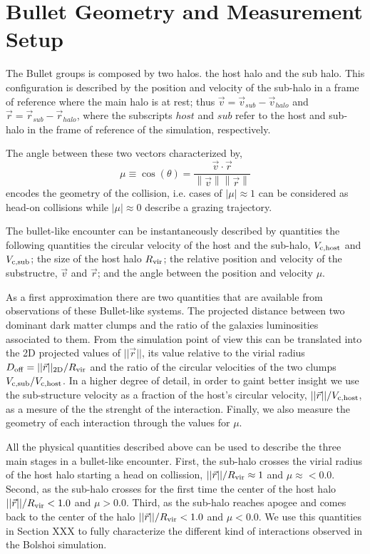 \documentclass{emulateapj}
\begin{document}
\section{Bullet Geometry and Measurement Setup}
\label{sec:setup}

The Bullet groups is composed by two halos. the host halo and the sub
halo. This configuration is described by the position and velocity of
the sub-halo in a frame of reference where the main halo is at rest;
thus  $\vec{v{}}=\vec{v}_{sub}-\vec{v}_{halo}$ and 
$\vec{r}=\vec{r}_{sub}-\vec{r}_{halo}$, where the subscripts $host$
and $sub$ refer to the host and sub-halo in the frame of reference of
the simulation, respectively.

The angle between these two vectors characterized by, 
\begin{equation}
  \mu\equiv
  \cos(\theta)=\frac{\vec{v{}}\cdotp{}\vec{r}}{\left\|\vec{v}{}\right\|
    \left\|\vec{r}\right\|} 
 \end{equation} 
%
encodes the geometry of the collision, i.e. cases of $|\mu|\approx 1$
can be considered as head-on collisions while $|\mu|\approx 0$
describe a grazing trajectory.

The bullet-like encounter can be instantaneously described by
quantities the following quantities the circular velocity of the host
and the sub-halo, $V_{\rm c,host}$ and $V_{\rm c,  sub}$; the size of
the host halo $R_{\rm vir}$; the relative position and velocity of the
substructre, $\vec{v}$ and $\vec{r}$; and the angle between the
position and velocity $\mu$. 

As a first approximation there are two quantities that are available
from observations of these Bullet-like systems. The projected distance
between two dominant dark matter clumps and the ratio of the
galaxies luminosities associated to them. From the simulation point
of view this can be translated into the 2D projected values of
$||\vec{r}||$, its value relative to the virial radius $D_{\rm off}=
||\vec{r}||_{\rm 2D}/R_{\rm vir}$ and the ratio of the circular velocities
of the two clumps $V_{\rm c,sub}/V_{\rm c,host}$. In a higher degree
of detail, in order to gaint better insight we use
the sub-structure velocity as a fraction of the host's circular
velocity, $||\vec{r}||/V_{\rm c, host}$, as a mesure of the the strenght
of the interaction.  Finally, we also measure the geometry of each
interaction through the values for $\mu$.


All the physical quantities described above can be used to describe
the three main stages in a bullet-like encounter. First, the sub-halo
crosses the virial radius of the host halo starting a head on
collission, $||\vec{r}||/R_{\rm vir}\approx 1$ and
$\mu\approx<0.0$. Second, as the sub-halo crosses for the first time
the center of the host halo $||\vec{r}||/R_{\rm vir} < 1.0$ and
$\mu>0.0$. Third, as the sub-halo reaches apogee and comes back to the
center of the halo $||\vec{r}||/R_{\rm vir} < 1.0$ and $\mu<0.0$. We use
this quantities in Section XXX to fully characterize the different
kind of interactions observed in the Bolshoi simulation. 
\end{document}
